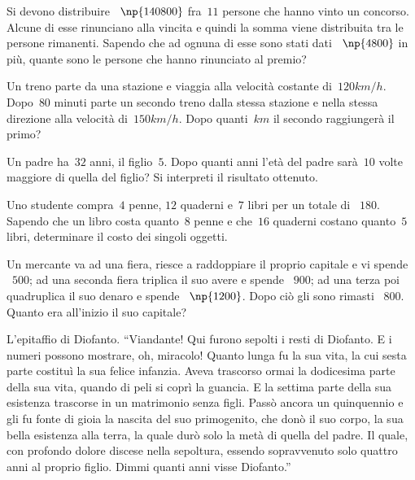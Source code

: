 \begin{multicols}{2}
\begin{esercizio}[\Ast]
\label{ese:16.66}
Si devono distribuire \officialeuro~$\np{140800}$ fra~$11$ persone che hanno vinto un concorso. Alcune di esse rinunciano alla vincita e quindi la somma viene distribuita tra le persone rimanenti. Sapendo che ad ognuna di esse sono stati dati \officialeuro~$\np{4800}$ in più, quante sono le persone che hanno rinunciato al premio?
\end{esercizio}

\begin{esercizio}[\Ast]
\label{ese:16.67}
Un treno parte da una stazione e viaggia alla velocità costante di~$120\unit{km/h}$. Dopo~$80$ minuti parte un secondo treno dalla stessa stazione e nella stessa direzione alla velocità di~$150\unit{km/h}$. Dopo quanti~$\unit{km}$ il secondo raggiungerà il primo?
\end{esercizio}

\begin{esercizio}[\Ast]
\label{ese:16.68}
Un padre ha~$32$ anni, il figlio~$5$. Dopo quanti anni l'età del padre sarà~$10$ volte maggiore di quella del figlio? Si interpreti il risultato ottenuto.
\end{esercizio}

\begin{esercizio}[\Ast]
\label{ese:16.69}
Uno studente compra~$4$ penne, $12$ quaderni e~$7$ libri per un totale di \officialeuro~$180$. Sapendo che un libro costa quanto~$8$ penne e che~$16$ quaderni costano quanto~$5$ libri, determinare il costo dei singoli oggetti.
\end{esercizio}

\begin{esercizio}[\Ast]
\label{ese:16.70}
Un mercante va ad una fiera, riesce a raddoppiare il proprio capitale e vi spende \officialeuro~$500$; ad una seconda fiera triplica il suo avere e spende \officialeuro~$900$; ad una terza poi quadruplica il suo denaro e spende \officialeuro~$\np{1200}$. Dopo ciò gli sono rimasti \officialeuro~$800$. Quanto era all'inizio il suo capitale?
\end{esercizio}

\begin{esercizio}[\Ast]
\label{ese:16.71}
L'epitaffio di Diofanto. ``Viandante! Qui furono sepolti i resti di Diofanto. E i numeri possono mostrare, oh, miracolo! Quanto lunga fu la sua vita, la cui sesta parte costituì la sua felice infanzia. Aveva trascorso ormai la dodicesima parte della sua vita, quando di peli si coprì la guancia. E la settima parte della sua esistenza trascorse in un matrimonio senza figli. Passò ancora un quinquennio e gli fu fonte di gioia la nascita del suo primogenito, che donò il suo corpo, la sua bella esistenza alla terra, la quale durò solo la metà di quella del padre. Il quale, con profondo dolore discese nella sepoltura, essendo sopravvenuto solo quattro anni al proprio figlio. Dimmi quanti anni visse Diofanto.''
\end{esercizio}


\end{multicols}
